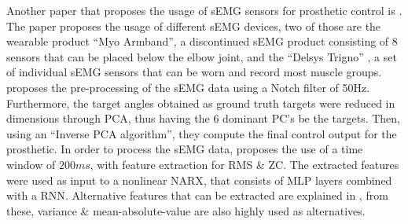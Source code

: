 \documentclass[../main.tex]{subfiles}
\begin{document}
Another paper that proposes the usage of sEMG sensors for prosthetic control is \cite{Zhaolong2021}.
The paper proposes the usage of different sEMG devices, two of those are the wearable product ``Myo Armband'', \cite{myo} a discontinued sEMG product consisting of 8 sensors that can be placed below the elbow joint, and the ``Delsys Trigno'' \cite{trigno}, a set of individual sEMG sensors that can be worn and record most muscle groups.
\cite{Zhaolong2021} proposes the pre-processing of the sEMG data using a Notch filter of 50Hz.
Furthermore, the target angles obtained as ground truth targets were reduced in dimensions through PCA, thus having the 6 dominant PC's be the targets.
Then, using an ``Inverse PCA algorithm'', they compute the final control output for the prosthetic.
In order to process the sEMG data, \cite{Zhaolong2021} proposes the use of a time window of $200ms$, with feature extraction for \gls{RMS} \& \gls{ZC}.
The extracted features were used as input to a nonlinear \gls{NARX}, that consists of \gls{MLP}   layers combined with a \gls{RNN}. 
Alternative features that can be extracted are explained in \cite{Tech2015}, from these, variance \& mean-absolute-value are also highly used as alternatives.
\end{document}
